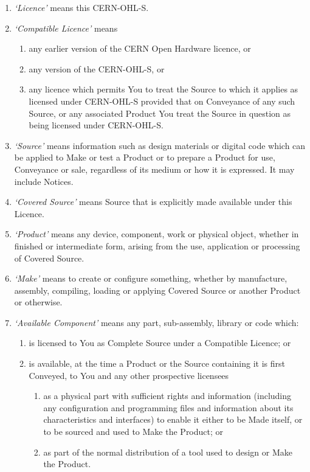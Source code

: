 \documentclass[10pt, a4paper]{article}
\begin{document}
\begin{enumerate}[label=\ref*{sec:definitions}.\arabic*]

\item \emph{`Licence'} means this CERN-OHL-S. 

\item \emph{`Compatible Licence'} means 
\begin{enumerate}[label=\alph*)]
\item any earlier version of the CERN Open Hardware licence, or
\item any version of the CERN-OHL-S, or 
\item any licence which permits You to treat the Source to which it applies as licensed under CERN-OHL-S provided that on Conveyance of any such Source, or any associated Product You treat the Source in question as being licensed under CERN-OHL-S. 
\end{enumerate}

\item \emph{`Source'} means information such as design materials or digital code which can be applied to Make or test a Product or to prepare a Product for use, Conveyance or sale, regardless of its medium or how it is expressed. It may include  Notices. 

\item \emph{`Covered Source'} means Source that is explicitly made available under this Licence.

\item \emph{`Product'} means any device, component, work or physical object, whether in finished or intermediate form, arising from the use, application or processing of Covered Source. 

\item \emph{`Make'} means to create or configure something, whether by manufacture, assembly, compiling, loading or applying Covered Source or another Product or otherwise.

\item \emph{`Available Component'} means any part, sub-assembly, library or code which:
\begin{enumerate}[label=\alph*)]
\item is licensed to You as Complete Source under a Compatible Licence; or 

\item is available, at the time a Product or the Source containing it is first Conveyed, to You and any other prospective licensees 
  \begin{enumerate}[label=\roman*)]
		\item as a physical part with sufficient rights and information (including any configuration and programming files and information about its characteristics and interfaces) to enable it either to be Made itself, or to be sourced and used to Make the Product; or 
    	\item as part of the normal distribution of a tool used to design or Make the Product.
    	

\end{enumerate}
\end{enumerate}
\end{enumerate}
\end{document}
